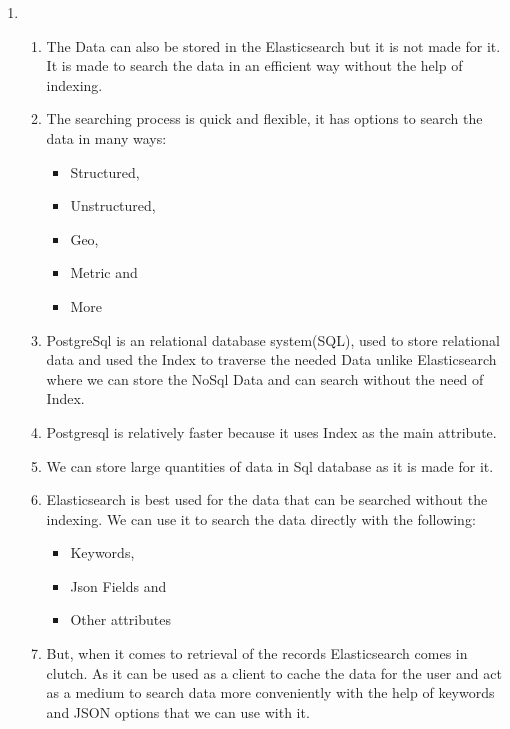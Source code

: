 \documentclass{article}
\begin{document}
{\begin{enumerate}
\begin{enumerate}
        \item Cost factors:\\
        All the drawbacks mentioned above may produce a huge impact on the cost of analysis as the Company's time will be wasted searching for the data in physical database. Rather, if the Company move towards the digitization they can save the time. Therefore, the money of the organization will be saved as time plays a large role when money is concerned.
    \end{enumerate}
    \item \begin{enumerate}
        \item The Data can also be stored in the Elasticsearch but it is not made for it. It is made to search the data in an efficient way without the help of indexing.
        \item The searching process is quick and flexible, it has options to search the data in many ways:
        \begin{itemize}
            \item Structured,
            \item Unstructured,
            \item Geo,
            \item Metric and
            \item More
        \end{itemize}
        \item PostgreSql is an relational database system(SQL), used to store relational data and used the Index to traverse the needed Data unlike Elasticsearch where we can store the NoSql Data and can search without the need of Index.
        \item Postgresql is relatively faster because it uses Index as the main attribute.
        \item We can store large quantities of data in Sql database as it is made for it.
        \item Elasticsearch is best used for the data that can be searched without the indexing. We can use it to search the data directly with the following:
        \begin{itemize}
            \item Keywords,
            \item Json Fields and
            \item Other attributes
        \end{itemize}
        \item But, when it comes to retrieval of the records Elasticsearch comes in clutch. As it can be used as a client to cache the data for the user and act as a medium to search data more conveniently with the help of keywords and JSON options that we can use with it.\\\\

\end{enumerate}
\end{enumerate}}
\end{document}
